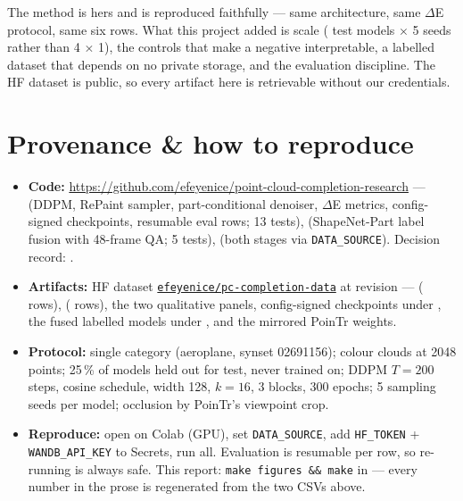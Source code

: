 \documentclass[11pt]{article}
\begin{document}
\noindent The method is hers and is reproduced faithfully --- same architecture, same
$\Delta$E protocol, same six rows. What this project added is scale (\nmodR{} test models
$\times$ 5 seeds rather than 4 $\times$ 1), the controls that make a negative
interpretable, a labelled dataset that depends on no private storage, and the evaluation
discipline. The HF dataset is public, so every artifact here is retrievable without our
credentials.

\section{Provenance \& how to reproduce}\label{app:prov}

\sloppy
\begin{itemize}
  \item \textbf{Code:} \url{https://github.com/efeyenice/point-cloud-completion-research} ---
   (DDPM, RePaint sampler, part-conditional denoiser, $\Delta$E
  metrics, config-signed checkpoints, resumable eval rows; 13 tests),
   (ShapeNet-Part label fusion with 48-frame QA; 5 tests),
   (both stages via \texttt{DATA\_SOURCE}).
  Decision record: .
  \item \textbf{Artifacts:} HF dataset
  \href{https://huggingface.co/datasets/efeyenice/pc-completion-data}{\texttt{efeyenice/pc-completion-data}}
  at revision \texttt{\datasetRev} ---  (\nrowsS{} rows),
   (\nrowsR{} rows), the two qualitative panels,
  config-signed checkpoints under , the \nLabeled{} fused labelled
  models under , and the mirrored PoinTr weights.
  \item \textbf{Protocol:} single category (aeroplane, synset 02691156); colour clouds at 2048
  points; 25\,\% of models held out for test, never trained on; DDPM $T{=}200$ steps, cosine
  schedule, width 128, $k{=}16$, 3 blocks, 300 epochs; 5 sampling seeds per model; occlusion by
  PoinTr's viewpoint crop.
  \item \textbf{Reproduce:} open  on Colab (GPU), set
  \texttt{DATA\_SOURCE}, add \texttt{HF\_TOKEN} + \texttt{WANDB\_API\_KEY} to Secrets, run all.
  Evaluation is resumable per row, so re-running is always safe. This report:
  \texttt{make figures \&\& make} in  --- every number
  in the prose is regenerated from the two CSVs above.
\end{itemize}
\end{document}
